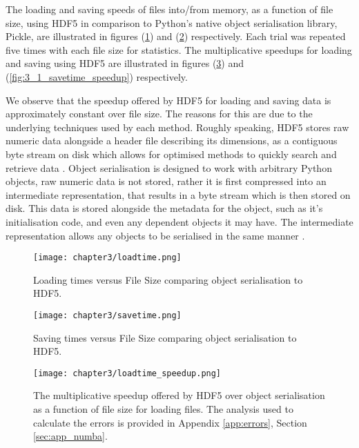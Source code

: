 The loading and saving speeds of files into/from memory, as a function of file size,
using HDF5 in comparison to Python's native object serialisation library, Pickle,
are illustrated in figures (\ref{fig:3_1_loadtime}) and (\ref{fig:3_1_savetime})
respectively. Each trial was repeated five times with each file size for statistics.
The multiplicative speedups for loading and saving using HDF5 are illustrated
in figures (\ref{fig:3_1_loadtime_speedup}) and (\ref{fig:3_1_savetime_speedup})
respectively.

We observe that the speedup offered by HDF5 for loading and saving
data is approximately constant over file size. The reasons for this are due to the underlying
techniques used by each method. Roughly speaking, HDF5 stores raw numeric data
alongside a header file describing its dimensions, as a contiguous byte stream
on disk which allows for optimised methods to quickly search and retrieve data
\cite{collette2013python}. Object serialisation is designed to work with arbitrary
Python objects, raw numeric data is not stored, rather it is first compressed
into an intermediate representation, that results in a byte stream which is then
stored on disk. This data is stored alongside the metadata for the object, such
as it's initialisation code, and even any dependent objects it may have. The
intermediate representation allows any objects to be serialised in the same
manner \cite{pickle}.

\begin{figure}
    \centering

  {\texttt{[image: chapter3/loadtime.png]}}
  \vspace{0pt}
    \caption{
        Loading times versus File Size comparing object serialisation to HDF5.
    }
    \label{fig:3_1_loadtime}
\end{figure}


\begin{figure}
    \centering

  {\texttt{[image: chapter3/savetime.png]}}
  \vspace{0pt}
    \caption{
        Saving times versus File Size comparing object serialisation to HDF5.
    }
    \label{fig:3_1_savetime}
\end{figure}


\begin{figure}
    \centering

  {\texttt{[image: chapter3/loadtime\_speedup.png]}}
  \vspace{0pt}
    \caption{
        The multiplicative speedup offered by HDF5 over object serialisation
        as a function of file size for loading files.
        The analysis used to calculate the errors is provided in
        Appendix \ref{app:errors}, Section \ref{sec:app_numba}.
    }
    \label{fig:3_1_loadtime_speedup}
\end{figure}


